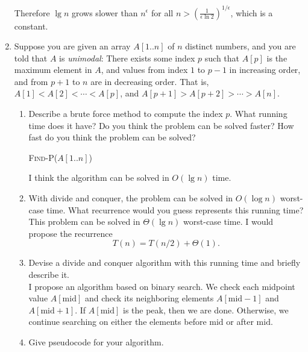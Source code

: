 \documentclass[letterpaper,11pt]{article}
\newcommand{\midd}{\ensuremath{\mathrm{mid}}}
\begin{document}
\begin{enumerate}
Therefore $\lg n$ grows slower than $n^\epsilon$ for all $n > \left(\frac{1}{\epsilon\ln 2}\right)^{1/\epsilon}$, which is a constant.


\newpage
\item Suppose you are given an array $A[1..n]$ of $n$ distinct numbers, and you are told that $A$ is \emph{unimodal}: There exists some index $p$ such that $A[p]$ is the maximum element in $A$, and values from index $1$ to $p-1$ in increasing order, and from $p+1$ to $n$ are in decreasing order. That is, $A[1]< A[2] < \cdots < A[p]$, and $A[p+1] > A[p+2] > \cdots > A[n]$.

\begin{enumerate}
\item Describe a brute force method to compute the index $p$. What running time does it have? Do you think the problem can be solved faster? How fast do you think the problem can be solved?\\

\begin{algorithm}[!h]
\textsc{Find-P}($A[1..n]$)
\begin{algorithmic}[1]
\State {}
\EndIf{}
\EndFor
\State {}
\end{algorithmic}
\end{algorithm}

I think the algorithm can be solved in $O(\lg n)$ time.

\item With divide and conquer, the problem can be solved in $O(\log n)$ worst-case time. What recurrence would you guess represents this running time?\\

This problem can be solved in $\Theta(\lg n)$ worst-case time. I would propose the recurrence
\[T(n) = T(n/2) + \Theta(1).\]

\item Devise a divide and conquer algorithm with this running time and briefly describe it.\\

I propose an algorithm based on binary search. We check each midpoint value $A[\midd]$ and check its neighboring elements $A[\midd-1]$ and $A[\midd+1]$. If $A[\midd]$ is the peak, then we are done. Otherwise, we continue searching on either the elements before $\midd$ or after $\midd$.\\

\newpage
\item Give pseudocode for your algorithm. \\


\end{enumerate}
\end{enumerate}
\end{document}
